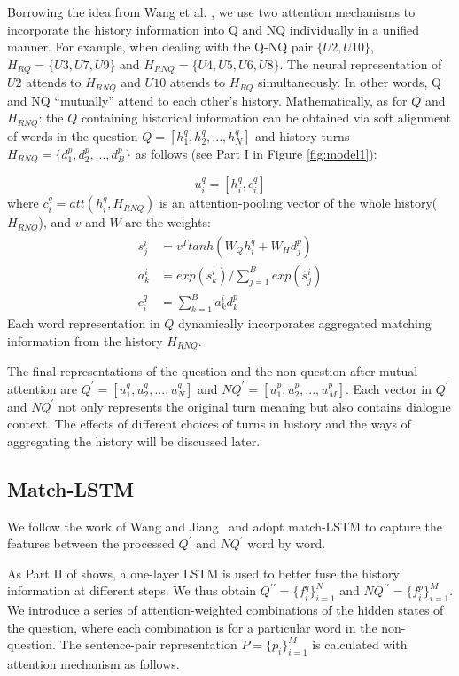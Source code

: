 Borrowing the idea from Wang et al. \cite{wang2017gated}, we use two attention mechanisms to incorporate the history information into Q and NQ individually in a unified manner. For example, when dealing with the Q-NQ pair $\{U2,U10\}$, $H_{RQ}=\{U3,U7,U9\}$ and $H_{RNQ}=\{U4,U5,U6,U8\}$. The neural representation of $U2$ attends to $H_{RNQ}$ and $U10$ attends to $H_{RQ}$ simultaneously.
In other words, Q and NQ ``mutually'' attend to each other's history. Mathematically, as for $Q$ and $H_{RNQ}$: the $Q$ containing historical information can be obtained  via soft alignment of words in the question $Q=[h^q_1,h^q_2,...,h^q_N]$ and history turns $H_{RNQ}=\{d^p_1,d^p_2,...,d^p_B\}$ as follows (see Part I in Figure \ref{fig:model1}):

\begin{equation}
u^q_i=[h^q_i,c^q_i]
\end{equation}
where $c^q_i=att(h^q_i,H_{RNQ})$ is an attention-pooling vector of the whole history($H_{RNQ}$),
and $v$ and $W$ are the weights:
\begin{equation}
\begin{aligned}
s^i_j&=v^Ttanh(W_Qh^q_i+W_Hd^p_j)\\
a^i_k&=exp(s^i_k)/\sum_{j=1}^Bexp(s^i_j)\\
c^q_i&=\sum_{k=1}^Ba^i_kd^p_k
\end{aligned}
\end{equation}
Each word representation in $Q$ dynamically incorporates aggregated matching information from the history $H_{RNQ}$. 

The final representations of the question and the non-question after
mutual attention are $Q^\prime=[u^q_1,u^q_2,...,u^q_N]$ and 
$NQ^\prime=[u^p_1,u^p_2,...,u^p_M]$. Each vector
in $Q^\prime$ and $NQ^\prime$ not only represents the original turn meaning 
but also contains dialogue context. The effects of 
different choices of turns in history and the ways of aggregating the 
history will be discussed later.


\subsection{Match-LSTM}
We follow the work of Wang and Jiang~\cite{wang2016learning} 
and adopt match-LSTM to capture the features between the 
processed $Q^\prime$ and $NQ^\prime$ word by word.

As Part II of  shows,
a one-layer LSTM is used to better fuse the history information at different steps.
We thus obtain $Q^{\prime\prime}=\{f^q_i\}_{i=1}^{N}$ and 
$NQ^{\prime\prime}=\{f^p_i\}_{i=1}^{M}$. 
We introduce a series of attention-weighted 
combinations of the hidden states of the question, where each combination is for a particular word in the non-question. The sentence-pair representation $P=\{p_i\}_{i=1}^{M}$ is calculated with attention mechanism as follows. 


